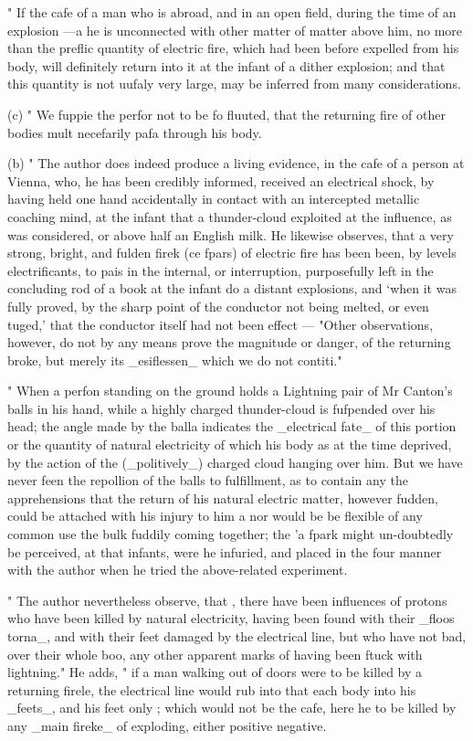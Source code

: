 \documentclass{article}
\begin{document}
" If the cafe of a man who is abroad, and in an open field, during the time of an explosion —a he is unconnected with other matter of matter above him, no more than the preflic quantity of electric fire, which had been before expelled from his body, will definitely return into it at the infant of a dither explosion; and that this quantity is not uufaly very large, may be inferred from many considerations.

(c) " We fuppie the perfor not to be fo fluuted, that the returning fire of other bodies mult necefarily pafa through his body.

(b) " The author does indeed produce a living evidence, in the cafe of a person at Vienna, who, he has been credibly informed, received an electrical shock, by having held one hand accidentally in contact with an intercepted metallic coaching mind, at the infant that a thunder-cloud exploited at the influence, as was considered, or above half an English milk. He likewise observes, that a very strong, bright, and fulden firek (ce fpars) of electric fire has been been, by levels electrificants, to pais in the internal, or interruption, purposefully left in the concluding rod of a book at the infant do a distant explosions, and ‘when it was fully proved, by the sharp point of the conductor not being melted, or even tuged,' that the conductor itself had not been effect — "Other observations, however, do not by any means prove the magnitude or danger, of the returning broke, but merely its \_esiflessen\_ which we do not contiti."

" When a perfon standing on the ground holds a Lightning pair of Mr Canton's balls in his hand, while a highly charged thunder-cloud is fufpended over his head; the angle made by the balla indicates the \_electrical fate\_ of this portion or the quantity of natural electricity of which his body as at the time deprived, by the action of the (\_politively\_) charged cloud hanging over him. But we have never feen the repollion of the balls to fulfillment, as to contain any the apprehensions that the return of his natural electric matter, however fudden, could be attached with his injury to him a nor would be be flexible of any common use the bulk fuddily coming together; the 'a fpark might un-doubtedly be perceived, at that infants, were he infuried, and placed in the four manner with the author when he tried the above-related experiment.

" The author nevertheless observe, that , there have been influences of protons who have been killed by natural electricity, having been found with their \_floos torna\_, and with their feet damaged by the electrical line, but who have not bad, over their whole boo, any other apparent marks of having been ftuck with lightning." He adds, " if a man walking out of doors were to be killed by a returning firele, the electrical line would rub into that each body into his \_feets\_, and his feet only ; which would not be the cafe, here he to be killed by any \_main fireke\_ of exploding, either positive negative.
\end{document}
